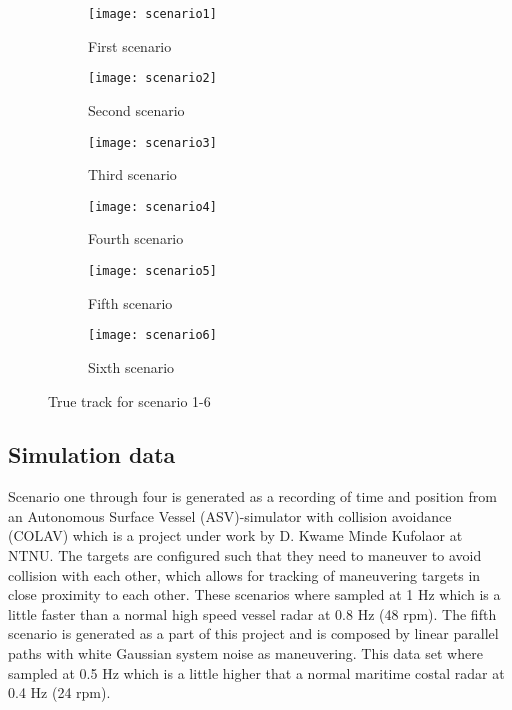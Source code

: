 \begin{figure}
    \centering
    \begin{subfigure}{0.49\textwidth}
        \centering
        \texttt{[image: scenario1]}
        \caption{First scenario}
    \end{subfigure}
    \begin{subfigure}{0.49\textwidth}
        \centering
        \texttt{[image: scenario2]}
        \caption{Second scenario}
    \end{subfigure}
    \begin{subfigure}{0.49\textwidth}
        \centering
        \texttt{[image: scenario3]}
        \caption{Third scenario}
    \end{subfigure}
    \begin{subfigure}{0.49\textwidth}
        \centering
        \texttt{[image: scenario4]}
        \caption{Fourth scenario}
    \end{subfigure}
    \begin{subfigure}{0.49\textwidth}
        \centering
        \texttt{[image: scenario5]}
        \caption{Fifth scenario}
    \end{subfigure}
    \begin{subfigure}{0.49\textwidth}
        \centering
        \texttt{[image: scenario6]}
        \caption{Sixth scenario}
    \end{subfigure}
    \caption{True track for scenario 1-6}
    \label{fig:true_tracks}
\end{figure} 

\subsection{Simulation data}
Scenario one through four is generated as a recording of time and position from an Autonomous Surface Vessel (ASV)-simulator with collision avoidance (COLAV) which is a project under work by D. Kwame Minde Kufolaor at NTNU. The targets are configured such that they need to maneuver to avoid collision with each other, which allows for tracking of maneuvering targets in close proximity to each other. These scenarios where sampled at 1 Hz which is a little faster than a normal high speed vessel radar at 0.8 Hz (48 rpm). The fifth scenario is generated as a part of this project and is composed by linear parallel paths with white Gaussian system noise as maneuvering. This data set where sampled at 0.5 Hz which is a little higher that a normal maritime costal radar at 0.4 Hz (24 rpm).

